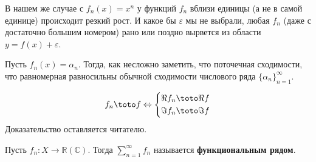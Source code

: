 \documentclass{article}
\let\eps\varepsilon
\begin{document}
\begin{remark}
\begin{figure}[H]
        \end{figure}
        В нашем же случае с $f_n(x)=x^n$ у функций $f_n$ вблизи единицы (а не в самой единице) происходит резкий рост. И какое бы $\eps$ мы не выбрали, любая $f_n$ (даже с достаточно большим номером) рано или поздно вырвется из области $y=f(x)+\eps$.
        \begin{figure}[H]
        \end{figure}
    \end{remark}
    \begin{example}
        Пусть $f_n(x)=\alpha_n$. Тогда, как несложно заметить, что поточечная сходимости, что равномерная равносильны обычной сходимости числового ряда $\{\alpha_n\}_{n=1}^\infty$.
    \end{example}
    \begin{claim}
        $$
        f_n\toto f\Leftrightarrow\left\{\begin{aligned}
            \Re f_n&\toto \Re f\\
            \Im f_n&\toto \Im f
        \end{aligned}\right.
        $$
        Доказательство оставляется читателю.
    \end{claim}
    \begin{definition}
        Пусть $f_n\colon X\to\mathbb R(\mathbb C)$. Тогда $\sum\limits_{n=1}^\infty f_n$ называется \textbf{функциональным рядом}.
    \end{definition}
\end{document}

